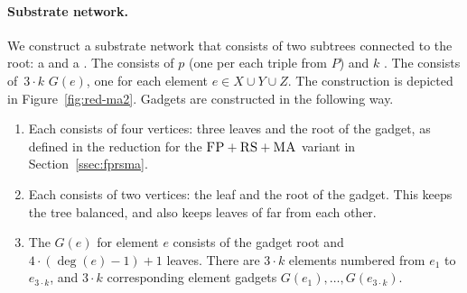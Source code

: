 \paragraph{Substrate network.}
We construct a substrate network that consists of two subtrees connected to the
  root: a \emph{\MatchSubtree} and a \emph{\CoverSubtree}. The
  {\MatchSubtree} consists of $p$ \emph{\TripleGadgets} (one per each triple from $P$) and $k$
  \emph{\UnqGadgets}. The {\CoverSubtree} consists of~$3\cdot k$ \emph{\ElGadgets} $G(e)$, one for each element $e\in X\cup Y\cup Z$.
  The construction is depicted in Figure~\ref{fig:red-ma2}. Gadgets are constructed in the following way.
\begin{enumerate}
  \item Each {\TripleGadget} consists of four vertices: three leaves and the root of the gadget, as defined in the reduction for the $\textsc{FP}+\textsc{RS}+\textsc{MA}$ variant in Section~\ref{ssec:fprsma}.
  \item Each {\UnqGadget} consists of two vertices: the leaf and the root of the gadget.
  This keeps the tree balanced, and also keeps leaves of
  {\UnqGadgets} far from each other.
  \item The {\ElGadget} $G(e)$ for element $e$ consists of the
  gadget root and~$4\cdot(\deg(e)-1)+1$ leaves. There are $3\cdot k$ elements numbered from $e_1$ to $e_{3\cdot k}$, and $3\cdot k $ corresponding element gadgets $G(e_1), \ldots, G(e_{3\cdot k})$.
\end{enumerate}

